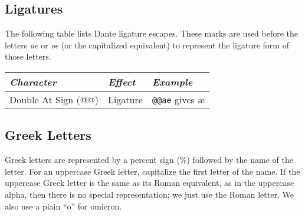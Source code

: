 \subsection{Ligatures}
The following table lists Dante ligature escapes.
These marks are used before the letters {\it ae} or {\it oe}
(or the capitalized equivalent)
to represent the ligature form of those letters.
\begin{center}
  \begin{tabular}{lll}
    {\em Character} & {\em Effect} & {\em Example} \\ \hline
    Double At Sign (@@) & Ligature & {\tt @@ae} gives \ae \\
  \end{tabular}
\end{center}

\subsection{Greek Letters}
Greek letters are represented by a percent sign (\%)
followed by the name
of the letter.
For an uppercase Greek letter, capitalize the first letter of the name.
If the uppercase Greek letter is the same as its Roman equivalent, as in
the uppercase alpha, then there is no special representation; we just use
the Roman letter.
We also use a plain ``o'' for omicron.

